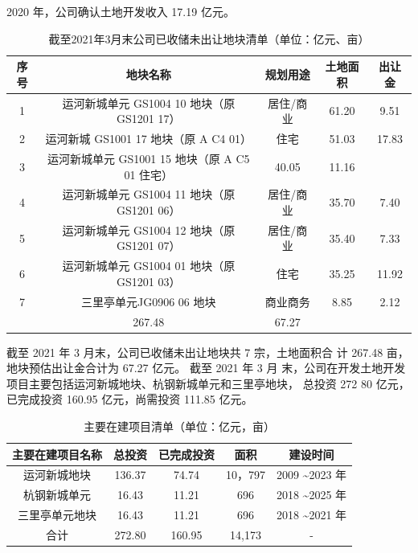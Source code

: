 \documentclass[H:\workspace\担保人财务信息2\杭州大运河\HangZhouText.tex]{subfiles}
\begin{document}
2020 年，公司确认土地开发收入 17.19 亿元。
\begin{table}[H]
    \centering 
    \xiaowuhao
    \setlength{\tabcolsep}{1.2em} %
    {\renewcommand{\arraystretch}{0.5} %
        \begin{tabular}{@{}c|c|c|c|c @{}}
            \toprule 
            序号 & 地块名称 & 规划用途 & 土地面积 & 出让金 \\
            \midrule 
            1 & 运河新城单元 GS1004 10 地块（原 GS1201 17）& 居住/商业 & 61.20 & 9.51 \\
            2 & 运河新城 GS1001 17 地块（原 A C4 01）& 住宅 & 51.03 &17.83 \\
            3 & 运河新城单元 GS1001 15 地块（原 A C5 01 住宅）& 40.05 & 11.16 \\ 
            4 & 运河新城单元 GS1004 11 地块（原 GS1201 06）& 居住/商业 & 35.70 & 7.40 \\
            5 & 运河新城单元 GS1004 12 地块（原 GS1201 07）& 居住/商业 & 35.40 & 7.33 \\
            6 & 运河新城单元 GS1004 01 地块（原 GS1201 03）& 住宅 & 35.25 & 11.92 \\
            7 & 三里亭单元JG0906 06 地块 & 商业商务 & 8.85 & 2.12 \\
            \addlinespace
            \midrule 
            \multicolumn{3}{c|}{合计} & 267.48 & 67.27 \\
            \bottomrule 
        \end{tabular}
    }
    \caption{截至2021年3月末公司已收储未出让地块清单（单位：亿元、亩）}
\end{table}

截至 2021 年 3 月末，公司已收储未出让地块共 7 宗，土地面积合
计 267.48 亩，地块预估出让金合计为 67.27 亿元。
截至 2021 年 3 月 末，公司在开发土地开发项目主要包括运河新城地块、杭钢新城单元和三里亭地块，
总投资 272 80 亿元，已完成投资 160.95 亿元，尚需投资 111.85 亿元。
\begin{table}[H]
    \centering 
    \xiaowuhao
    \setlength{\tabcolsep}{1.2em} %
    {\renewcommand{\arraystretch}{0.5} %
    \begin{tabular}{@{}c|c|c|c|c@{}}
        \toprule 
        主要在建项目名称 & 总投资 & 已完成投资 & 面积 & 建设时间 \\
        \midrule 
        运河新城地块 & 136.37 & 74.74 & 10，797 & 2009 \textasciitilde 2023 年 \\ 
        杭钢新城单元 & 16.43 & 11.21 & 696 & 2018 \textasciitilde 2025 年 \\ 
        三里亭单元地块 & 16.43 & 11.21 & 696 & 2018 \textasciitilde 2021 年 \\
        \midrule 
        合计 & 272.80 & 160.95 & 14,173 & - \\
        \bottomrule 
    \end{tabular}
    }
    \caption{主要在建项目清单（单位：亿元，亩）}
\end{table}
 
\end{document}
